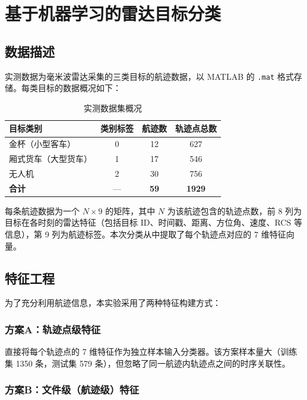 \documentclass[12pt,a4paper]{ctexart}
\begin{document}
\section{基于机器学习的雷达目标分类}

\subsection{数据描述}

实测数据为毫米波雷达采集的三类目标的航迹数据，以 MATLAB 的 \texttt{.mat} 格式存储。每类目标的数据概况如下：

\begin{table}[H]
\centering
\caption{实测数据集概况}
\begin{tabular}{lccc}
\toprule
\textbf{目标类别} & \textbf{类别标签} & \textbf{航迹数} & \textbf{轨迹点总数} \\
\midrule
金杯（小型客车） & 0 & 12 & 627 \\
厢式货车（大型货车） & 1 & 17 & 546 \\
无人机 & 2 & 30 & 756 \\
\midrule
\textbf{合计} & — & \textbf{59} & \textbf{1929} \\
\bottomrule
\end{tabular}
\end{table}

每条航迹数据为一个 $N \times 9$ 的矩阵，其中 $N$ 为该航迹包含的轨迹点数，前 8 列为目标在各时刻的雷达特征（包括目标 ID、时间戳、距离、方位角、速度、RCS 等信息），第 9 列为航迹标签。本次分类从中提取了每个轨迹点对应的 7 维特征向量。

\subsection{特征工程}

为了充分利用航迹信息，本实验采用了两种特征构建方式：

\subsubsection{方案A：轨迹点级特征}

直接将每个轨迹点的 7 维特征作为独立样本输入分类器。该方案样本量大（训练集 1350 条，测试集 579 条），但忽略了同一航迹内轨迹点之间的时序关联性。

\subsubsection{方案B：文件级（航迹级）特征}
\end{document}
